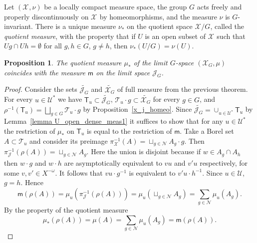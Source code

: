 \documentclass[12pt]{article}
\newcommand{\xmo}{X^{-\omega}}
\newcommand{\limGs}[1][G]{\mathcal{X}_{#1}}
\newcommand{\lims}[1][G]{\mathscr{J}_{#1}}
\newcommand{\muls}{\mathsf{m}}
\newcommand{\tile}{\mathscr{T}}
\newcommand{\T}{\mathsf{T}}
\newcommand{\nucl}{\mathcal{N}}
\newtheorem{prop}[theor]{Proposition}
\theoremstyle{definition}
\begin{document}
Let $(\limGs[],\nu)$ be a locally compact measure space, the group $G$ acts freely and properly
discontinuously on $\limGs[]$ by homeomorphisms, and the measure $\nu$ is $G$-invariant. There is a
unique measure $\nu_{*}$ on the quotient space $\limGs[]/G$, called the \textit{quotient measure},
with the property that if $U$ is an open subset of $\limGs[]$ such that $Ug\cap Uh=\emptyset$ for
all $g,h\in G$, $g\neq h$, then $\nu_{*}(U/G)=\nu(U)$.


\begin{prop}
The quotient measure $\mu_{*}$ of the limit $G$-space $(\limGs,\mu)$ coincides with the measure
$\muls$ on the limit space $\lims$.
\end{prop}
\begin{proof}
Consider the sets $\tilde{\lims}$ and $\tilde{\limGs}$ of full measure from the previous theorem.
For every $u\in\mathcal{U}^*$ we have $\T_u\subset\tilde{\lims}$, $\tile_u\cdot
g\subset\tilde{\limGs}$ for every $g\in G$, and $\rho^{-1}(\T_u)=\bigsqcup_{g\in G} \tile_u\cdot g$
by Proposition~\ref{x_j_homeo}. Since $\tilde{\lims}=\cup_{u\in\mathcal{U}^*}\T_u$ by
Lemma~\ref{lemma U_open_dense_meas1} it suffices to show that for any $u\in\mathcal{U}^*$ the
restriction of $\mu_{*}$ on $\T_u$ is equal to the restriction of $\muls$. Take a Borel set
$A\subset\tile_u$ and consider its preimage $\pi^{-1}_{\limGs[]}(A)=\sqcup_{g\in\nucl} A_g\cdot g$.
Then $\pi^{-1}_{\lims[]}(\rho(A))=\sqcup_{g\in\nucl} A_g$. Here the union is disjoint because if
$w\in{A_g\cap{}A_h}$ then $w\cdot g$ and $w\cdot h$ are asymptotically equivalent to $vu$ and $v'u$
respectively, for some $v,v'\in\xmo$. It follows that $vu\cdot g^{-1}$ is equivalent to $v'u\cdot
h^{-1}$. Since $u\in\mathcal{U}$, $g=h$. Hence
\[
\muls(\rho(A))=\mu_u(\pi^{-1}_{\lims[]}(\rho(A)))=\mu_u(\sqcup_{g\in\nucl}
A_g)=\sum_{g\in\nucl}\mu_u(A_g).
\]
By the property of the quotient measure
\[
\mu_{*}(\rho(A))=\mu(A)=\sum_{g\in\nucl}\mu_u(A_g)=\muls(\rho(A)).
\]
\end{proof}
\end{document}
